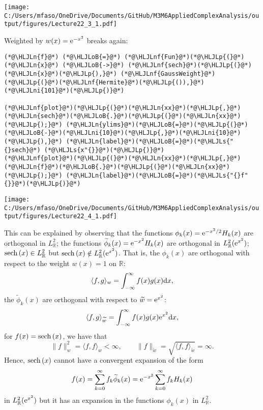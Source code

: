 \documentclass[12pt,landscape]{article}
\newcommand{\HLJLn}[1]{#1}
\newcommand{\HLJLnf}[1]{\textcolor[RGB]{66,102,213}{#1}}
\newcommand{\HLJLs}[1]{\textcolor[RGB]{201,61,57}{#1}}
\newcommand{\HLJLni}[1]{\textcolor[RGB]{59,151,46}{#1}}
\newcommand{\HLJLoB}[1]{\textcolor[RGB]{102,102,102}{\textbf{#1}}}
\newcommand{\HLJLp}[1]{#1}
\def\D{ {\rm d} }
\def\E{ {\rm e} }
\def\sech{ {\rm sech}\, }
\def\cent#1{\begin{center}#1\end{center} }
\begin{document}
{\cent{\texttt{[image: C:/Users/mfaso/OneDrive/Documents/GitHub/M3M6AppliedComplexAnalysis/output/figures/Lecture22\_3\_1.pdf]}}

Weighted by $w(x) = \E^{-x^2}$ breaks again:


\begin{lstlisting}
(*@\HLJLn{f}@*) (*@\HLJLoB{=}@*) (*@\HLJLnf{Fun}@*)(*@\HLJLp{(}@*)(*@\HLJLn{x}@*) (*@\HLJLoB{->}@*) (*@\HLJLnf{sech}@*)(*@\HLJLp{(}@*)(*@\HLJLn{x}@*)(*@\HLJLp{),}@*) (*@\HLJLnf{GaussWeight}@*)(*@\HLJLp{(}@*)(*@\HLJLnf{Hermite}@*)(*@\HLJLp{()),}@*)(*@\HLJLni{101}@*)(*@\HLJLp{)}@*)

(*@\HLJLnf{plot}@*)(*@\HLJLp{(}@*)(*@\HLJLn{xx}@*)(*@\HLJLp{,}@*) (*@\HLJLn{sech}@*)(*@\HLJLoB{.}@*)(*@\HLJLp{(}@*)(*@\HLJLn{xx}@*)(*@\HLJLp{);}@*) (*@\HLJLn{ylims}@*)(*@\HLJLoB{=}@*)(*@\HLJLp{(}@*)(*@\HLJLoB{-}@*)(*@\HLJLni{10}@*)(*@\HLJLp{,}@*)(*@\HLJLni{10}@*)(*@\HLJLp{),}@*) (*@\HLJLn{label}@*)(*@\HLJLoB{=}@*)(*@\HLJLs{"{}sech}@*) (*@\HLJLs{x"{}}@*)(*@\HLJLp{)}@*)
(*@\HLJLnf{plot}@*)(*@\HLJLp{(}@*)(*@\HLJLn{xx}@*)(*@\HLJLp{,}@*) (*@\HLJLn{f}@*)(*@\HLJLoB{.}@*)(*@\HLJLp{(}@*)(*@\HLJLn{xx}@*)(*@\HLJLp{);}@*) (*@\HLJLn{label}@*)(*@\HLJLoB{=}@*)(*@\HLJLs{"{}f"{}}@*)(*@\HLJLp{)}@*)
\end{lstlisting}

\cent{\texttt{[image: C:/Users/mfaso/OneDrive/Documents/GitHub/M3M6AppliedComplexAnalysis/output/figures/Lecture22\_4\_1.pdf]}}

This can be explained by observing that the functions
$\phi_k(x) = \E^{-x^2/2}H_k(x)$
 are orthogonal in $L^2_{\mathbb{R}}$; the functions
$\widetilde{\phi}_k(x) = \E^{-x^2}H_k(x)$
are orthogonal in $L^2_{\mathbb{R}}(\E^{x^2})$; $\sech(x) \in L^2_{\mathbb{R}}$ but  $\sech(x) \notin L^2_{\mathbb{R}}(\E^{x^2})$. That is, the  $\phi_k(x)$ are orthogonal with respect to the weight $w(x) = 1$ on $\mathbb{R}$:
$$
\langle f, g \rangle_{w} = \int_{-\infty}^{\infty}f(x)g(x) \D x,
$$
the $\widetilde{\phi}_k(x)$ are orthogonal with respect to $\widetilde{w} = \E^{x^2}$:
$$
\langle f, g \rangle_{\widetilde{w}} = \int_{-\infty}^{\infty}f(x)g(x) \E^{x^2} \D x,
$$
for $f(x) = \sech(x)$, we have that
$$
\| f \|_{w}^2 = \langle f, f \rangle_{w} < \infty, \qquad \| f \|_{\widetilde{w}} = \sqrt{\langle f, f \rangle_{\widetilde{w}}} = \infty.
$$
Hence, $\sech(x)$ cannot have a convergent expansion of the form
$$
f(x) = \sum_{k = 0}^{\infty} f_k \widetilde{\phi}_k(x) = \E^{-x^2}  \sum_{k = 0}^{\infty} f_k H_k(x)
$$
in $L^2_{\mathbb{R}}(\E^{x^2})$ but it has an expansion in the functions $\phi_k(x)$ in $L^2_{\mathbb{R}}$.

}
\end{document}
